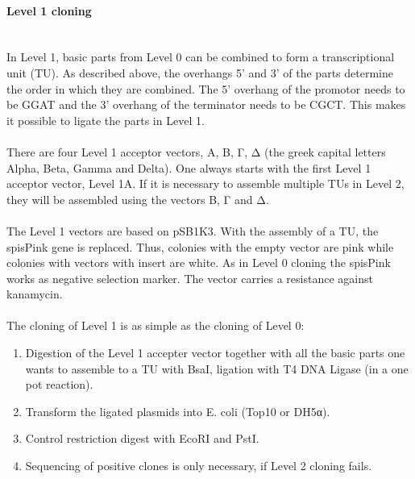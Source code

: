 \paragraph{Level 1 cloning} \mbox{} \\
In Level 1, basic parts from Level 0 can be combined to form a transcriptional unit (TU). As described above, the overhangs 5’ and 3’ of the parts determine the order in which they are combined. The 5’ overhang of the promotor needs to be GGAT and the 3’ overhang of the terminator needs to be CGCT. This makes it possible to ligate the parts in Level 1. \\ \\
There are four Level 1 acceptor vectors, A, B, Γ, Δ (the greek capital letters Alpha, Beta, Gamma and Delta). One always starts with the first Level 1 acceptor vector, Level 1A. If it is necessary to assemble multiple TUs in Level 2, they will be assembled using the vectors B, Γ and Δ. \\ \\
The Level 1 vectors are based on pSB1K3. With the assembly of a TU, the spisPink gene is replaced. Thus, colonies with the empty vector are pink while colonies with vectors with insert are white. As in Level 0 cloning the spisPink works as negative selection marker. The vector carries a resistance against kanamycin.\\ \\
The cloning of Level 1 is as simple as the cloning of Level 0:
\begin{enumerate}
    \item Digestion of the Level 1 accepter vector together with all the basic parts one wants to assemble to a TU with BsaI, ligation with T4 DNA Ligase (in a one pot reaction).
    \item Transform the ligated plasmids into E. coli (Top10 or DH5α).
    \item Control restriction digest with EcoRI and PstI.
\item Sequencing of positive clones is only necessary, if Level 2 cloning fails.
\end{enumerate}
